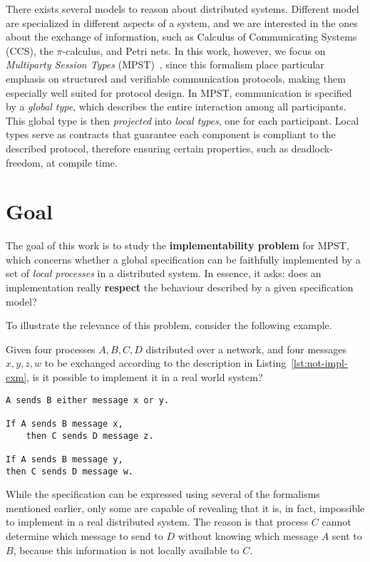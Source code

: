 There exists several models to reason about distributed systems.
Different model are specialized in different aspects of a system, and we
are interested in the ones about the exchange of information, such as
Calculus of Communicating Systems (CCS), the $\pi$-calculus, and Petri nets.
In this work, however, we focus on 
\textit{Multiparty Session Types} (MPST)~\cite{honda2008multiparty},
since this formalism place particular emphasis on structured and 
verifiable communication protocols, making them especially well suited 
for protocol design.
In MPST, communication is specified by a \emph{global type}, which 
describes the entire interaction among all participants. 
This global type is then \emph{projected} into 
\emph{local types}, one for each participant. 
Local types serve as contracts that guarantee each component is compliant 
to the described protocol, therefore ensuring certain properties, 
such as deadlock-freedom, at compile time. 

\section{Goal}
The goal of this work is to study the \textbf{implementability
problem} for MPST, which concerns whether a global specification can be
faithfully implemented by a set of \textit{local processes} in a
distributed system.
In essence, it asks: does an implementation really \textbf{respect}
the behaviour described by a given specification model?

To illustrate the relevance of this problem, consider the following
example.

\bigskip

\begin{example}
Given four processes $A, B, C, D$ distributed over
a network, and four messages $x, y, z, w$ to be exchanged according to
the description in Listing~\ref{lst:not-impl-exm}, is it possible to
implement it in a real world system?

\bigskip

\begin{lstlisting}[caption={Example specification of message exchanges},
                   label={lst:not-impl-exm},
                   keywordstyle=\color{blue}\bfseries,morekeywords={sends,If,then}]
A sends B either message x or y.

If A sends B message x,
    then C sends D message z.

If A sends B message y,
then C sends D message w.
\end{lstlisting}

While the specification can be expressed using several of the
formalisms mentioned earlier, only some are capable of revealing that
it is, in fact, impossible to implement in a real distributed system.
The reason is that process $C$ cannot determine which message to send
to $D$ without knowing which message $A$ sent to $B$, because this 
information is not locally available to $C$.
\end{example}

